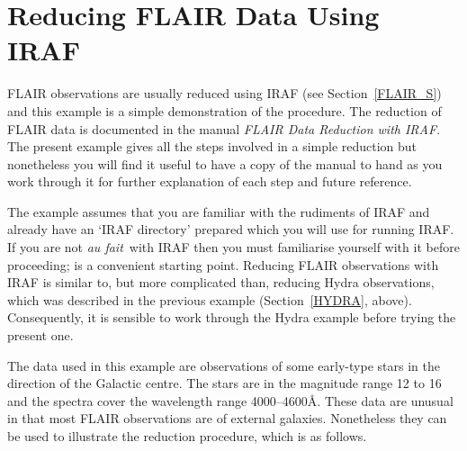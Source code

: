 \documentclass[twoside,11pt]{starlink}
\begin{document}
\newpage
\section{\label{FLAIR}Reducing FLAIR Data Using IRAF}

FLAIR observations are usually reduced using IRAF (see
Section~\ref{FLAIR_S}) and this example is a simple demonstration
of the procedure.  The reduction of FLAIR data is documented
in the manual \textit{FLAIR Data Reduction with
IRAF}\/\cite{DRINK96}.  The present example gives all the steps
involved in a simple reduction but nonetheless you will find it
useful to have a copy of the manual to hand as you work through
it for further explanation of each step and future reference.

The example assumes that you are familiar with the rudiments
of IRAF and already have an `IRAF directory' prepared which
you will use for running IRAF.  If you are not \textit{au fait}\, with
IRAF then you must familiarise yourself with it before proceeding;
\/\cite{SG12}
is a convenient starting point.  Reducing FLAIR observations with
IRAF is similar to, but more complicated than, reducing Hydra
observations, which was described in the previous example
(Section~\ref{HYDRA}, above).  Consequently, it is sensible to work
through the Hydra example before trying the present one.

The data used in this example are observations of some early-type
stars in the direction of the Galactic centre.  The stars are in
the magnitude range 12 to 16 and the spectra cover the wavelength
range 4000--4600\AA.  These data are unusual in that most FLAIR
observations are of external galaxies.  Nonetheless they can be used
to illustrate the reduction procedure, which is as follows.
\end{document}
